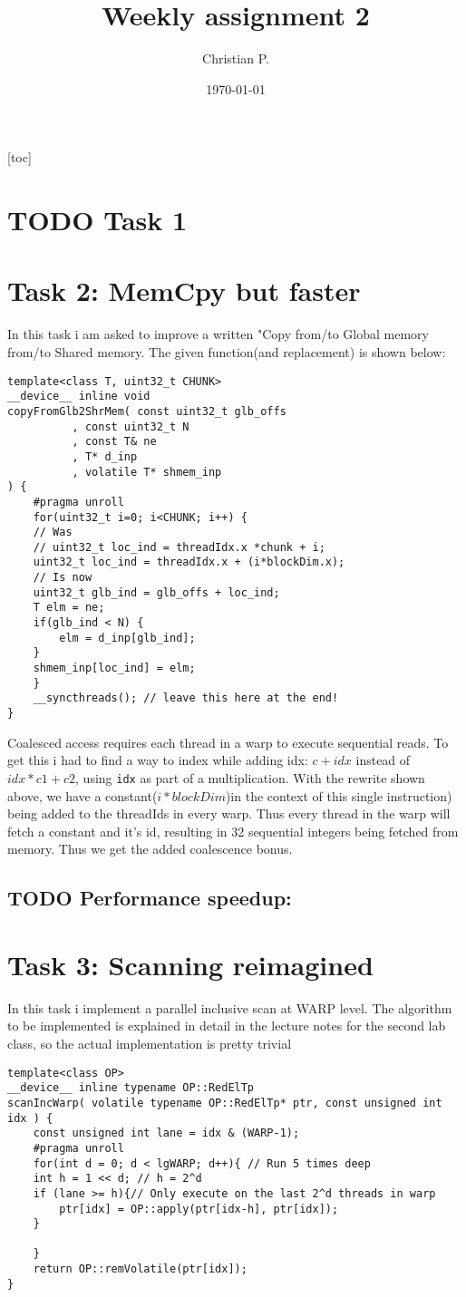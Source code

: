 \documentclass[11pt]{article}
\author{Christian P.}
\date{\today}
\title{Weekly assignment 2}
\begin{document}
\maketitle
\tableofcontents

[toc]
\section{{\bfseries\sffamily TODO} Task 1}
\label{sec:org0faf0d8}
\section{Task 2: MemCpy but faster}
\label{sec:org2e39d21}
In this task i am asked to improve a written "Copy from/to Global memory from/to Shared memory.  
The given function(and replacement) is shown below:
\begin{verbatim}
template<class T, uint32_t CHUNK>
__device__ inline void
copyFromGlb2ShrMem( const uint32_t glb_offs
		  , const uint32_t N
		  , const T& ne
		  , T* d_inp
		  , volatile T* shmem_inp
) {
    #pragma unroll
    for(uint32_t i=0; i<CHUNK; i++) {
	// Was 
	// uint32_t loc_ind = threadIdx.x *chunk + i;
	uint32_t loc_ind = threadIdx.x + (i*blockDim.x);
	// Is now
	uint32_t glb_ind = glb_offs + loc_ind;
	T elm = ne;
	if(glb_ind < N) { 
	    elm = d_inp[glb_ind];
	}
	shmem_inp[loc_ind] = elm;
    }
    __syncthreads(); // leave this here at the end!
}
\end{verbatim}
Coalesced access requires each thread in a warp to execute sequential reads.
To get this i had to find a way to index while adding idx: \(c + idx\) instead of 
\(idx * c1 + c2\), using \texttt{idx} as part of a multiplication. With the rewrite
shown above, we have a constant(\(i*blockDim\))in the context of this single instruction) 
being added to the threadIds in every warp. Thus every thread in the warp will fetch
a constant and it's id, resulting in 32 sequential integers being fetched from
memory. Thus we get the added coalescence bonus.
\subsection{{\bfseries\sffamily TODO} Performance speedup:}
\label{sec:org0f4377f}

\section{Task 3: Scanning reimagined}
\label{sec:org4d35db7}
In this task i implement a parallel inclusive scan at WARP level. The algorithm
to be implemented is explained in detail in the lecture notes for the second 
lab class, so the actual implementation is pretty trivial
\begin{verbatim}
template<class OP>
__device__ inline typename OP::RedElTp
scanIncWarp( volatile typename OP::RedElTp* ptr, const unsigned int idx ) {
    const unsigned int lane = idx & (WARP-1);
    #pragma unroll
    for(int d = 0; d < lgWARP; d++){ // Run 5 times deep
	int h = 1 << d; // h = 2^d
	if (lane >= h){// Only execute on the last 2^d threads in warp
	    ptr[idx] = OP::apply(ptr[idx-h], ptr[idx]);
	}

    }
    return OP::remVolatile(ptr[idx]);
}
\end{verbatim}
\end{document}
